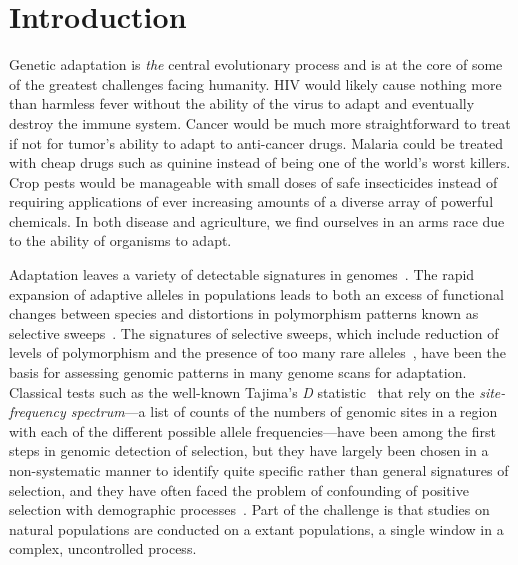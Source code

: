 \section{Introduction}

Genetic adaptation is \emph{the} central evolutionary process and is
at the core of some of the greatest challenges facing humanity. HIV
would likely cause nothing more than harmless fever without the
ability of the virus to adapt and eventually destroy the immune
system. Cancer would be much more straightforward to treat if not for
tumor's ability to adapt to anti-cancer drugs. Malaria could be
treated with cheap drugs such as quinine instead of being one of the
world's worst killers. Crop pests would be manageable with small doses
of safe insecticides instead of requiring applications of ever
increasing amounts of a diverse array of powerful chemicals. In both
disease and agriculture, we find ourselves in an arms race due to the
ability of organisms to adapt.

Adaptation leaves a variety of detectable signatures in
genomes~\cite{Akey09, Kreitman00, MesserAndPetrov13, Nielsen05,
  SabetiEtAl06}. The rapid expansion of adaptive alleles in
populations leads to both an excess of functional changes between
species and distortions in polymorphism patterns known as selective
sweeps~\cite{Nielsen05}. The signatures of selective sweeps, which
include reduction of levels of polymorphism and the presence of too
many rare alleles~\cite{Nielsen05, Przeworski02}, have been the basis
for assessing genomic patterns in many genome scans for
adaptation. Classical tests such as the well-known Tajima's \emph{D}
statistic~\cite{Tajima89} that rely on the \emph{site-frequency
  spectrum}---a list of counts of the numbers of genomic sites in a
region with each of the different possible allele frequencies---have
been among the first steps in genomic detection of selection, but they
have largely been chosen in a non-systematic manner to identify quite
specific rather than general signatures of selection, and they have
often faced the problem of confounding of positive selection with
demographic processes~\cite{PtakAndPrzeworski02, RamosOnsinsAndRojas}.
Part of the challenge is that studies on natural populations are
conducted on a extant populations, a single window in a complex,
uncontrolled process.

